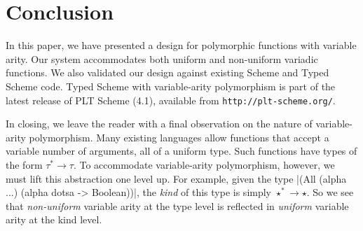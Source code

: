 \section{Conclusion}
\label{sec:conclude}

In this paper, we have presented a design for polymorphic functions
with variable arity.  Our system accommodates both uniform and non-uniform
variadic functions.
We also validated our design against existing Scheme
and Typed Scheme code.  Typed Scheme with variable-arity polymorphism
is part of the latest 
release of PLT Scheme (4.1), available from \Verb|http://plt-scheme.org/|.

In closing, we leave the reader with a final observation on the nature
of variable-arity polymorphism.  Many existing languages  allow
functions that accept a variable number of arguments, all of a
uniform type.  Such functions have types of the form $\tau^*
\rightarrow \tau$.  To accommodate variable-arity
polymorphism, however, we must lift this abstraction one level up.  For
example, given the type \scheme|(All (alpha ...) (alpha dotsa ->
Boolean))|, the \emph{kind} of this type is simply $\star^*
\rightarrow \star$.  So we see that \emph{non-uniform} variable arity at the
type level is reflected in \emph{uniform} variable arity at the kind level.
